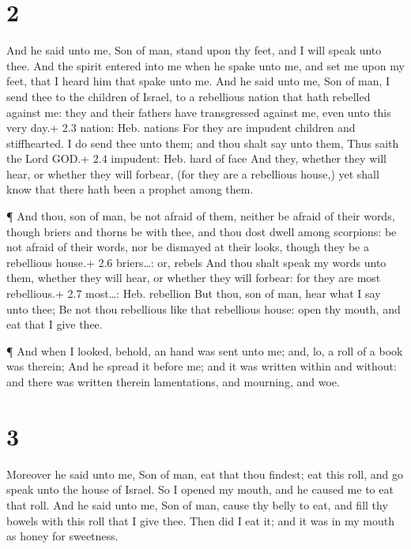 \hypertarget{section-1}{%
\section{2}\label{section-1}}

 And he said unto me, Son of man, stand upon thy feet, and I
will speak unto thee.  And the spirit entered into me when
he spake unto me, and set me upon my feet, that I heard him that spake
unto me.  And he said unto me, Son of man, I send thee to
the children of Israel, to a rebellious nation that hath rebelled
against me: they and their fathers have transgressed against me, even
unto this very day.+ 2.3 nation: Heb. nations  For they are
impudent children and stiffhearted. I do send thee unto them; and thou
shalt say unto them, Thus saith the Lord GOD.+ 2.4 impudent: Heb. hard
of face  And they, whether they will hear, or whether they
will forbear, (for they are a rebellious house,) yet shall know that
there hath been a prophet among them.

 ¶ And thou, son of man, be not afraid of them, neither be
afraid of their words, though briers and thorns be with thee, and thou
dost dwell among scorpions: be not afraid of their words, nor be
dismayed at their looks, though they be a rebellious house.+ 2.6
briers\ldots: or, rebels  And thou shalt speak my words unto
them, whether they will hear, or whether they will forbear: for they are
most rebellious.+ 2.7 most\ldots: Heb. rebellion  But thou,
son of man, hear what I say unto thee; Be not thou rebellious like that
rebellious house: open thy mouth, and eat that I give thee.

 ¶ And when I looked, behold, an hand was sent unto me; and,
lo, a roll of a book was therein;  And he spread it before
me; and it was written within and without: and there was written therein
lamentations, and mourning, and woe.

\hypertarget{section-2}{%
\section{3}\label{section-2}}

 Moreover he said unto me, Son of man, eat that thou
findest; eat this roll, and go speak unto the house of Israel.
 So I opened my mouth, and he caused me to eat that roll.
 And he said unto me, Son of man, cause thy belly to eat,
and fill thy bowels with this roll that I give thee. Then did I eat it;
and it was in my mouth as honey for sweetness.

